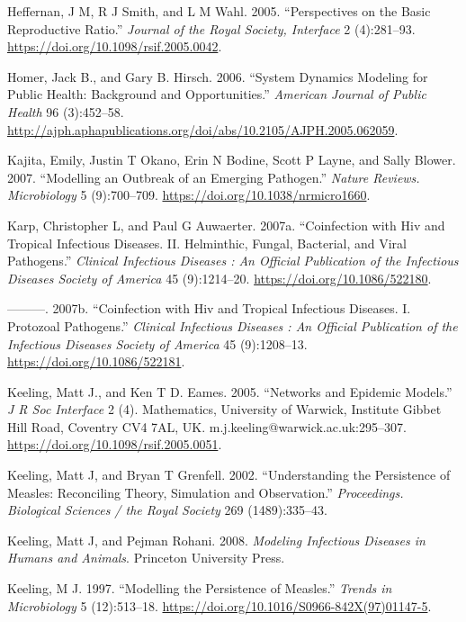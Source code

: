 \documentclass[]{book}
\theoremstyle{definition}
\theoremstyle{definition}
\theoremstyle{definition}
\theoremstyle{remark}
\begin{document}
\leavevmode\hypertarget{ref-heffernan05}{}%
Heffernan, J M, R J Smith, and L M Wahl. 2005. ``Perspectives on the
Basic Reproductive Ratio.'' \emph{Journal of the Royal Society,
Interface} 2 (4):281--93. \url{https://doi.org/10.1098/rsif.2005.0042}.

\leavevmode\hypertarget{ref-homer06}{}%
Homer, Jack B., and Gary B. Hirsch. 2006. ``System Dynamics Modeling for
Public Health: Background and Opportunities.'' \emph{American Journal of
Public Health} 96 (3):452--58.
\url{http://ajph.aphapublications.org/doi/abs/10.2105/AJPH.2005.062059}.

\leavevmode\hypertarget{ref-kajita07}{}%
Kajita, Emily, Justin T Okano, Erin N Bodine, Scott P Layne, and Sally
Blower. 2007. ``Modelling an Outbreak of an Emerging Pathogen.''
\emph{Nature Reviews. Microbiology} 5 (9):700--709.
\url{https://doi.org/10.1038/nrmicro1660}.

\leavevmode\hypertarget{ref-karp07}{}%
Karp, Christopher L, and Paul G Auwaerter. 2007a. ``Coinfection with Hiv
and Tropical Infectious Diseases. II. Helminthic, Fungal, Bacterial, and
Viral Pathogens.'' \emph{Clinical Infectious Diseases : An Official
Publication of the Infectious Diseases Society of America} 45
(9):1214--20. \url{https://doi.org/10.1086/522180}.

\leavevmode\hypertarget{ref-karp07a}{}%
---------. 2007b. ``Coinfection with Hiv and Tropical Infectious
Diseases. I. Protozoal Pathogens.'' \emph{Clinical Infectious Diseases :
An Official Publication of the Infectious Diseases Society of America}
45 (9):1208--13. \url{https://doi.org/10.1086/522181}.

\leavevmode\hypertarget{ref-keeling05}{}%
Keeling, Matt J., and Ken T D. Eames. 2005. ``Networks and Epidemic
Models.'' \emph{J R Soc Interface} 2 (4). Mathematics, University of
Warwick, Institute Gibbet Hill Road, Coventry CV4 7AL, UK.
m.j.keeling@warwick.ac.uk:295--307.
\url{https://doi.org/10.1098/rsif.2005.0051}.

\leavevmode\hypertarget{ref-keeling02}{}%
Keeling, Matt J, and Bryan T Grenfell. 2002. ``Understanding the
Persistence of Measles: Reconciling Theory, Simulation and
Observation.'' \emph{Proceedings. Biological Sciences / the Royal
Society} 269 (1489):335--43.

\leavevmode\hypertarget{ref-keeling08}{}%
Keeling, Matt J, and Pejman Rohani. 2008. \emph{Modeling Infectious
Diseases in Humans and Animals}. Princeton University Press.

\leavevmode\hypertarget{ref-keeling97}{}%
Keeling, M J. 1997. ``Modelling the Persistence of Measles.''
\emph{Trends in Microbiology} 5 (12):513--18.
\url{https://doi.org/10.1016/S0966-842X(97)01147-5}.
\end{document}
